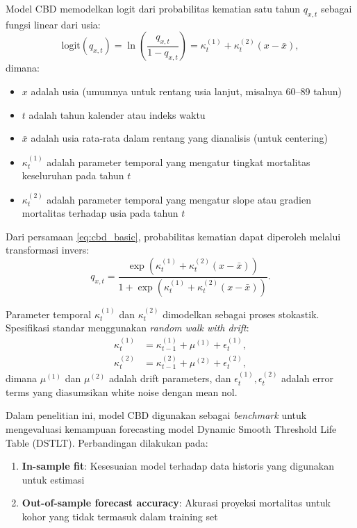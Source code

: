 Model CBD memodelkan logit dari probabilitas kematian satu tahun $q_{x,t}$ sebagai fungsi linear dari usia:
\begin{equation}
\text{logit}(q_{x,t}) = \ln\left(\frac{q_{x,t}}{1-q_{x,t}}\right) = \kappa_t^{(1)} + \kappa_t^{(2)} (x - \bar{x}),
\label{eq:cbd_basic}
\end{equation}
dimana:
\begin{itemize}
    \item $x$ adalah usia (umumnya untuk rentang usia lanjut, misalnya 60--89 tahun)
    \item $t$ adalah tahun kalender atau indeks waktu
    \item $\bar{x}$ adalah usia rata-rata dalam rentang yang dianalisis (untuk centering)
    \item $\kappa_t^{(1)}$ adalah parameter temporal yang mengatur tingkat mortalitas keseluruhan pada tahun $t$
    \item $\kappa_t^{(2)}$ adalah parameter temporal yang mengatur slope atau gradien mortalitas terhadap usia pada tahun $t$
\end{itemize}

Dari persamaan \eqref{eq:cbd_basic}, probabilitas kematian dapat diperoleh melalui transformasi invers:
\begin{equation}
q_{x,t} = \frac{\exp(\kappa_t^{(1)} + \kappa_t^{(2)} (x - \bar{x}))}{1 + \exp(\kappa_t^{(1)} + \kappa_t^{(2)} (x - \bar{x}))}.
\label{eq:cbd_qx}
\end{equation}

Parameter temporal $\kappa_t^{(1)}$ dan $\kappa_t^{(2)}$ dimodelkan sebagai proses stokastik. Spesifikasi standar menggunakan \textit{random walk with drift}:
\begin{align}
\kappa_t^{(1)} &= \kappa_{t-1}^{(1)} + \mu^{(1)} + \epsilon_t^{(1)}, \label{eq:cbd_rw1} \\
\kappa_t^{(2)} &= \kappa_{t-1}^{(2)} + \mu^{(2)} + \epsilon_t^{(2)}, \label{eq:cbd_rw2}
\end{align}
dimana $\mu^{(1)}$ dan $\mu^{(2)}$ adalah drift parameters, dan $\epsilon_t^{(1)}, \epsilon_t^{(2)}$ adalah error terms yang diasumsikan white noise dengan mean nol.



Dalam penelitian ini, model CBD digunakan sebagai \textit{benchmark} untuk mengevaluasi kemampuan forecasting model Dynamic Smooth Threshold Life Table (DSTLT). Perbandingan dilakukan pada:
\begin{enumerate}
    \item \textbf{In-sample fit}: Kesesuaian model terhadap data historis yang digunakan untuk estimasi
    \item \textbf{Out-of-sample forecast accuracy}: Akurasi proyeksi mortalitas untuk kohor yang tidak termasuk dalam training set
\end{enumerate}

